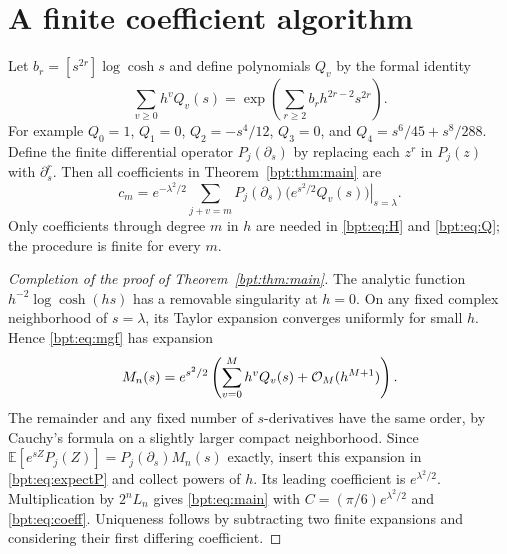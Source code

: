 \documentclass[11pt]{article}
\theoremstyle{remark}\newtheorem{remark}[theorem]{Remark}
\newcommand{\E}{\mathbb E}\newcommand{\Prb}{\mathbb P}
\begin{document}
\section{A finite coefficient algorithm}\label{bpt:sec:algorithm}
Let $b_r=[s^{2r}]\log\cosh s$ and define polynomials $Q_v$ by the formal identity
\begin{equation}\label{bpt:eq:Q}
 \sum_{v\ge0}h^vQ_v(s)
 =\exp\left(\sum_{r\ge2}b_rh^{2r-2}s^{2r}\right).
\end{equation}
For example $Q_0=1$, $Q_1=0$, $Q_2=-s^4/12$, $Q_3=0$,
and $Q_4=s^6/45+s^8/288$. Define the finite differential operator
$P_j(\partial_s)$ by replacing each $z^r$ in $P_j(z)$ with $\partial_s^r$.
Then all coefficients in Theorem~\ref{bpt:thm:main} are
\begin{equation}\label{bpt:eq:coeff}
 c_m=e^{-\lambda^2/2}
       \sum_{j+v=m}
       \left.P_j(\partial_s)\big(e^{s^2/2}Q_v(s)\big)\right|_{s=\lambda}.
\end{equation}
Only coefficients through degree $m$ in $h$ are needed in \eqref{bpt:eq:H} and \eqref{bpt:eq:Q}; the procedure is finite for every $m$.

\begin{proof}[Completion of the proof of Theorem~\ref{bpt:thm:main}]
The analytic function $h^{-2}\log\cosh(hs)$ has a removable singularity at $h=0$. On any fixed complex neighborhood of $s=\lambda$, its Taylor expansion converges uniformly for small $h$. Hence \eqref{bpt:eq:mgf} has expansion
\[
 M_n(s)=e^{s^2/2}\left(\sum_{v=0}^M h^vQ_v(s)
                         +\mathcal O_M(h^{M+1})\right).
\]
The remainder and any fixed number of $s$-derivatives have the same order, by Cauchy's formula on a slightly larger compact neighborhood.
Since $\E[e^{sZ}P_j(Z)]=P_j(\partial_s)M_n(s)$ exactly, insert this expansion in \eqref{bpt:eq:expectP} and collect powers of $h$. Its leading coefficient is $e^{\lambda^2/2}$. Multiplication by $2^nL_n$ gives \eqref{bpt:eq:main} with
$C=(\pi/6)e^{\lambda^2/2}$ and \eqref{bpt:eq:coeff}. Uniqueness follows by subtracting two finite expansions and considering their first differing coefficient.
\end{proof}
\end{document}
